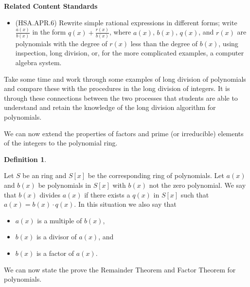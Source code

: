 \documentclass[
]{book}
\providecommand{\tightlist}{%
  \setlength{\itemsep}{0pt}\setlength{\parskip}{0pt}}
\newenvironment{standards}{}{}
\theoremstyle{definition}
\newtheorem{definition}{Definition}[chapter]
\theoremstyle{definition}
\theoremstyle{definition}
\theoremstyle{definition}
\theoremstyle{remark}
\begin{document}
\begin{standards}

\begin{center}
\textbf{Related Content Standards}

\end{center}

\begin{itemize}
\tightlist
\item
  (HSA.APR.6) Rewrite simple rational expressions in different forms; write \(\frac{a(x)}{b(x)}\) in the form \(q(x)+\frac{r(x)}{b(x)}\), where \(a(x)\), \(b(x)\), \(q(x)\), and \(r(x)\) are polynomials with the degree of \(r(x)\) less than the degree of \(b(x)\), using inspection, long division, or, for the more complicated examples, a computer algebra system.
\end{itemize}

\end{standards}

Take some time and work through some examples of long division of polynomials and compare these with the procedures in the long division of integers. It is through these connections between the two processes that students are able to understand and retain the knowledge of the long division algorithm for polynomials.

We can now extend the properties of factors and prime (or irreducible) elements of the integers to the polynomial ring.

\begin{definition}
\protect\hypertarget{def:unlabeled-div-121}{}\label{def:unlabeled-div-121}

Let \(S\) be an ring and \(S[x]\) be the corresponding ring of polynomials. Let \(a(x)\) and \(b(x)\) be polynomials in \(S[x]\) with \(b(x)\) not the zero polynomial. We say that \(b(x)\) divides \(a(x)\) if there exists a \(q(x)\) in \(S[x]\) such that \(a(x)=b(x)\cdot q(x)\). In this situation we also say that

\begin{itemize}
\tightlist
\item
  \(a(x)\) is a multiple of \(b(x)\),
\item
  \(b(x)\) is a divisor of \(a(x)\), and
\item
  \(b(x)\) is a factor of \(a(x)\).
\end{itemize}

\end{definition}

We can now state the prove the Remainder Theorem and Factor Theorem for polynomials.
\end{document}
